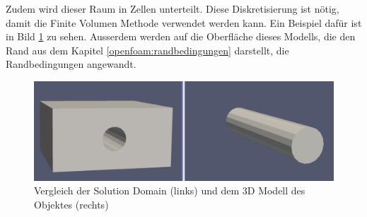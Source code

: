 Zudem wird dieser Raum in Zellen unterteilt.
Diese Diskretisierung ist nötig, damit die Finite Volumen Methode verwendet werden kann.
Ein Beispiel dafür ist in Bild \ref{openfoam:fig:SD_Modell_vergleich} zu sehen.
Ausserdem werden auf die Oberfläche dieses Modells, die den Rand aus dem Kapitel \ref{openfoam:randbedingungen} darstellt, die Randbedingungen angewandt.
\begin{figure}
	\centering
	\includegraphics[scale=0.1]{papers/openfoam/Bilder/vergleich_solution_domain_object.png}
	\caption{Vergleich der Solution Domain (links) und dem 3D Modell des Objektes (rechts)}
	\label{openfoam:fig:SD_Modell_vergleich}
\end{figure}

